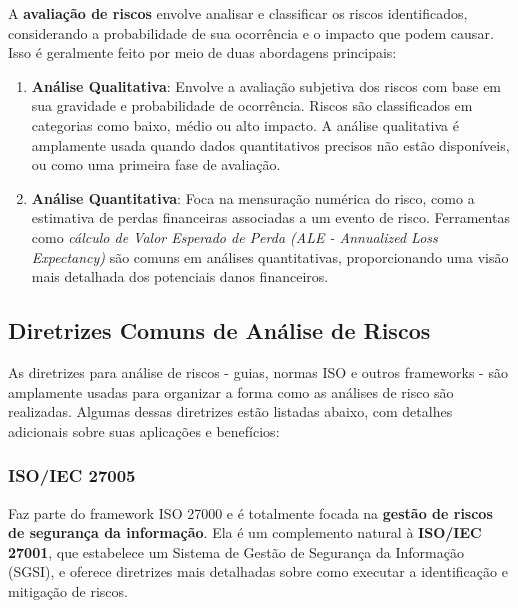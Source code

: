 \documentclass[12pt,oneside,a4paper,article]{abntex2}
\begin{document}
A \textbf{avaliação de riscos} envolve analisar e classificar os riscos identificados, considerando a probabilidade de sua ocorrência e o impacto que podem causar. Isso é geralmente feito por meio de duas abordagens principais:

\begin{enumerate}
    \item \textbf{Análise Qualitativa}: Envolve a avaliação subjetiva dos riscos com base em sua gravidade e probabilidade de ocorrência. Riscos são classificados em categorias como baixo, médio ou alto impacto. A análise qualitativa é amplamente usada quando dados quantitativos precisos não estão disponíveis, ou como uma primeira fase de avaliação.
    
    \item \textbf{Análise Quantitativa}: Foca na mensuração numérica do risco, como a estimativa de perdas financeiras associadas a um evento de risco. Ferramentas como \textit{cálculo de Valor Esperado de Perda (ALE - Annualized Loss Expectancy)} são comuns em análises quantitativas, proporcionando uma visão mais detalhada dos potenciais danos financeiros.
\end{enumerate}


\subsection {\textbf{Diretrizes Comuns de Análise de Riscos}}


As diretrizes para análise de riscos - guias, normas ISO e outros frameworks - são amplamente usadas para organizar a forma como as análises de risco são realizadas. Algumas dessas diretrizes estão listadas abaixo, com detalhes adicionais sobre suas aplicações e benefícios:

\subsubsection{\textbf{ISO/IEC 27005}}

Faz parte do framework ISO 27000 e é totalmente focada na \textbf{gestão de riscos de segurança da informação}. Ela é um complemento natural à \textbf{ISO/IEC 27001}, que estabelece um Sistema de Gestão de Segurança da Informação (SGSI), e oferece diretrizes mais detalhadas sobre como executar a identificação e mitigação de riscos.
\end{document}
